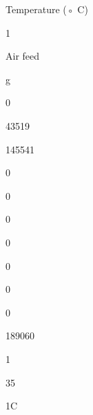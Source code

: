 \documentclass[a4paper,portrait,12pt]{article}
\begin{document}
\begin{flushleft}
Temperature (◦ C)
\end{flushleft}





1





\begin{flushleft}
Air feed
\end{flushleft}





\begin{flushleft}
g
\end{flushleft}





0





43519





145541





0





0





0





0





0





0





0





189060





1





35





\begin{flushleft}
1C
\end{flushleft}
\end{document}
